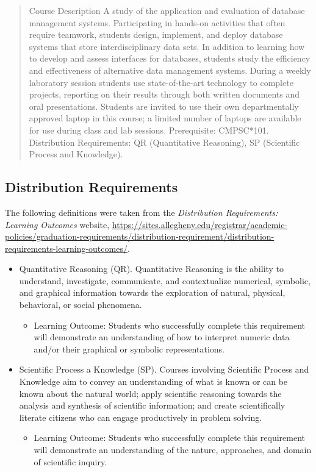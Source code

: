 \documentclass[11pt]{article} %
\begin{document}
\begin{quote}

Course Description
A study of the application and evaluation of database management systems. Participating in hands-on activities that often require teamwork, students design, implement, and deploy database systems that store interdisciplinary data sets. In addition to learning how to develop and assess interfaces for databases, students study the efficiency and effectiveness of alternative data management systems. During a weekly laboratory session students use state-of-the-art technology to complete projects, reporting on their results through both written documents and oral presentations. Students are invited to use their own departmentally approved laptop in this course; a limited number of laptops are available for use during class and lab sessions. Prerequisite: CMPSC*101. Distribution Requirements: QR (Quantitative Reasoning), SP (Scientific Process and Knowledge).

\end{quote}



\subsection*{Distribution Requirements}
The following definitions were taken from the \emph{Distribution Requirements: Learning Outcomes} website, \url{https://sites.allegheny.edu/registrar/academic-policies/graduation-requirements/distribution-requirement/distribution-requirements-learning-outcomes/}.

\begin{itemize}
	\item Quantitative Reasoning (QR). Quantitative Reasoning is the ability to understand, investigate, communicate, and contextualize numerical, symbolic, and graphical information towards the exploration of natural, physical, behavioral, or social phenomena.

	\begin{itemize}
		\item Learning Outcome: Students who successfully complete this requirement will demonstrate an understanding of how to interpret numeric data and/or their graphical or symbolic representations.
	\end{itemize}


	\item Scientific Process a Knowledge (SP). Courses involving Scientific Process and Knowledge aim to convey an understanding of what is known or can be known about the natural world; apply scientific reasoning towards the analysis and synthesis of scientific information; and create scientifically literate citizens who can engage productively in problem solving.
	
	\begin{itemize}
		\item Learning Outcome: Students who successfully complete this requirement will demonstrate an understanding of the nature, approaches, and domain of scientific inquiry.
	\end{itemize}
\end{itemize}
\end{document}
